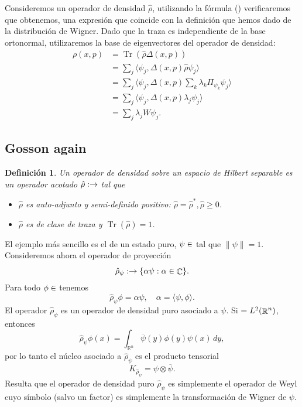 \documentclass[a4paper]{report}
\DeclareMathOperator{\R}{\mathbb{R}}
\DeclareMathOperator{\C}{\mathbb{C}}
\let\H\relax
\DeclareMathOperator{\H}{\mathcal H}
\DeclareMathOperator{\Tr}{Tr}
\newtheorem{definition}{Definición}
\begin{document}
  Consideremos un operador de densidad $\hat{\rho}$,
  utilizando la fórmula () verificaremos que obtenemos, una
  expresión que coincide con la definición que hemos dado de
  la distribución de Wigner. Dado que la traza es
  independiente de la base ortonormal, utilizaremos la base
  de eigenvectores del operador de densidad:
  \begin{align*}
    \rho(x,p) &= \Tr\left( \hat{\rho} \Delta(x,p) \right) \\
              &= \sum_{j}^{} \langle \psi_j, 
              \Delta(x,p) \hat{\rho} \psi_j \rangle \\
              &= \sum_{j}^{} \langle \psi_j, \Delta(x,p)
              \sum_{k}^{} \lambda_k \Pi_{\psi_k} \psi_j
              \rangle \\
              &= \sum_{j}^{} \langle \psi_j, \Delta(x,p)
              \lambda_j \psi_j \rangle \\
              &= \sum_{j}^{} \lambda_j W\psi_j.
  \end{align*}

  \subsection{Gosson again}

  \begin{definition}
    Un operador de densidad sobre un espacio de Hilbert
    separable es un operador acotado $\hat{\rho} : \H \to
    \H$ tal que
    \begin{itemize}
      \item $\hat{\rho}$ es auto-adjunto y semi-definido
        positivo: $\hat{\rho} = \hat{\rho}^{*}, \hat{\rho}
        \geq 0$.
      \item $\hat{\rho}$ es de clase de traza y
        $\Tr(\hat{\rho}) = 1$.
    \end{itemize}
  \end{definition}

  El ejemplo más sencillo es el de un estado puro, $\psi \in
  \H$ tal que $\|\psi\| = 1$. Consideremos ahora el operador
  de proyección
  \[
    \hat{\rho}_\psi : \H \to \{\alpha \psi : \alpha \in
    \C\}.
  \] 
  Para todo $\phi \in \H$ tenemos
  \[
    \hat{\rho}_\psi \phi
    = \alpha \psi,
    \quad \alpha = \langle \psi, \phi \rangle.
  \] 
  El operador $\hat{\rho}_\psi$ es un operador de densidad
  puro asociado a $\psi$. Si $\H = L^2(\R^{n})$, entonces
  \[
    \hat{\rho}_\psi \phi(x)
    = \int_{\R^{n}} \overline{\psi}(y)\phi(y) \psi(x) \, dy,
  \] 
  por lo tanto el núcleo asociado a $\hat{\rho}_\psi$ es el
  producto tensorial
  \[
    K_{\hat{\rho}_\psi} = \psi \otimes \overline{\psi}.
  \] 
  Resulta que el operador de densidad puro $\hat{\rho}_\psi$ 
  es simplemente el operador de Weyl cuyo símbolo (salvo un
  factor) es simplemente la transformación de Wigner de
  $\psi$.
\end{document}
